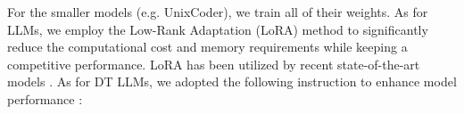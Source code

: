 For the smaller models (e.g. UnixCoder), we train all of their weights. As for LLMs, we employ the Low-Rank Adaptation (LoRA) method \cite{edward2022lora} to significantly reduce the computational cost and memory requirements while keeping a competitive performance. LoRA has been utilized by recent state-of-the-art models \cite{parishad2024llm2vec,lee2024nvembed}. As for DT LLMs, we adopted the following instruction to enhance model performance \cite{muennighoff2024gritlm,lee2024nvembed,parishad2024llm2vec}:

\begin{center}
\end{center}
